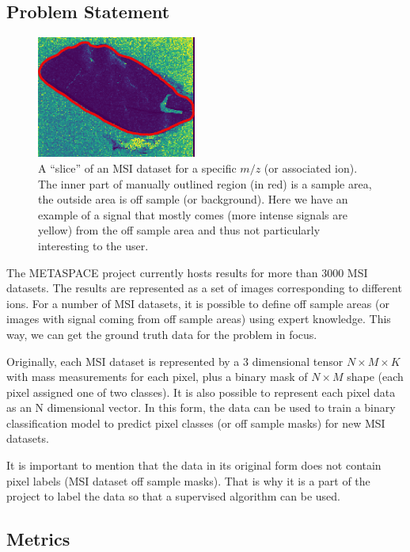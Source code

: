 \documentclass[a4paper]{article}
\begin{document}
\subsection*{Problem Statement}

\begin{figure}[H]
    \centering
    \caption{A “slice” of an MSI dataset for a specific $m/z$ (or associated ion).
    The inner part of manually outlined region (in red) is a sample area, the outside area
    is off sample (or background).
    Here we have an example of a signal that mostly comes (more intense signals are yellow) from
    the off sample area and thus not particularly interesting to the user.}
    \includegraphics[width=\textwidth,height=4cm,keepaspectratio]{ion_image_1.png}
\end{figure}

The METASPACE project currently hosts results for more than 3000 MSI datasets. The results
are represented as a set of images corresponding to different ions. For a number of MSI
datasets, it is possible to define off sample areas (or images with signal coming from off sample areas)
using expert knowledge. This way, we can get the ground truth data for the problem in focus.

Originally, each MSI dataset is represented by a 3 dimensional tensor $N \times M \times K$
with mass measurements for each pixel,
plus a binary mask of $N \times M$ shape (each pixel assigned one of two classes).
It is also possible to
represent each pixel data as an N dimensional vector. In this form, the data can be used to train
a binary classification model to predict pixel classes (or off sample masks) for new MSI datasets.

It is important to mention that the data in its original form does not contain pixel labels
(MSI dataset off sample masks). That is why it is a part of the project to label the data so that
a supervised algorithm can be used.

\subsection*{Metrics}
\end{document}

